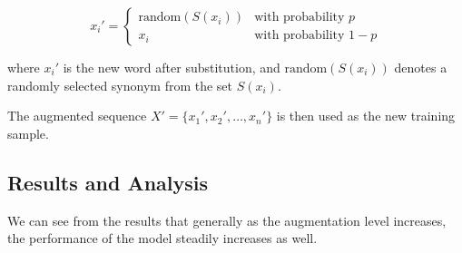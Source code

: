 \documentclass[10pt]{extarticle}
\begin{document}
\[
  x_i' =
  \begin{cases}
    \text{random}(S(x_i)) & \text{with probability } p     \\
    x_i                   & \text{with probability } 1 - p
  \end{cases}
\]

where \( x_i' \) is the new word after substitution, and
\(\text{random}(S(x_i))\) denotes a randomly selected synonym from the set \(
S(x_i) \).

The augmented sequence \( X' = \{x_1', x_2', \ldots, x_n'\} \) is then used as
the new training sample.

\subsection{Results and Analysis}

We can see from the results that generally as the augmentation level increases,
the performance of the model steadily increases as well.
\end{document}
